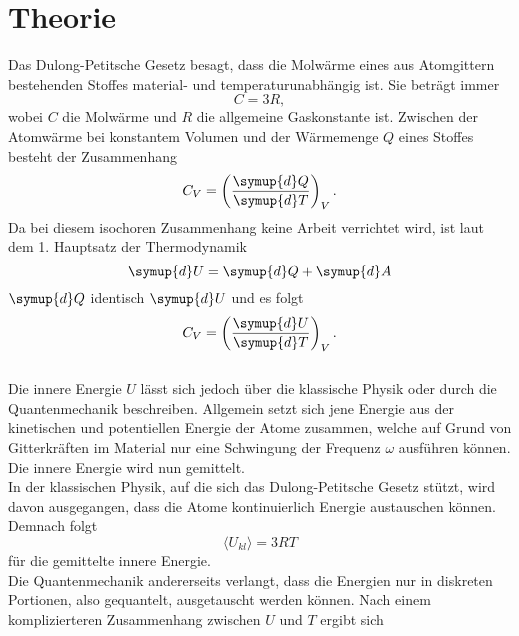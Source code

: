 \section{Theorie}
\label{sec:Theorie}
Das Dulong-Petitsche Gesetz besagt, dass die Molwärme eines aus Atomgittern bestehenden Stoffes material- und temperaturunabhängig ist.
Sie beträgt immer
\begin{equation}
  C = 3R,
  \label{eqn:1}
\end{equation}
wobei $C$ die Molwärme und $R$ die allgemeine Gaskonstante ist.
Zwischen der Atomwärme bei konstantem Volumen und der Wärmemenge $Q$ eines Stoffes besteht der Zusammenhang
\begin{equation}
  C_V = \left(\frac{\symup{d}Q}{\symup{d}T}\right)_V.
\end{equation}
Da bei diesem isochoren Zusammenhang keine Arbeit verrichtet wird, ist laut dem 1. Hauptsatz der Thermodynamik
\begin{equation}
  \symup{d}U = \symup{d}Q + \symup{d}A
  \label{eqn:2}
\end{equation}
$\symup{d}Q$ identisch $\symup{d}U$ und es folgt
\begin{equation}
  C_V = \left(\frac{\symup{d}U}{\symup{d}T}\right)_V.
\end{equation}\\
Die innere Energie $U$ lässt sich jedoch über die klassische Physik oder durch die Quantenmechanik beschreiben.
Allgemein setzt sich jene Energie aus der kinetischen und potentiellen Energie der Atome zusammen, welche auf Grund von Gitterkräften im Material nur eine Schwingung der Frequenz $\omega$ ausführen können.
Die innere Energie wird nun gemittelt.\\
In der klassischen Physik, auf die sich das Dulong-Petitsche Gesetz stützt, wird davon ausgegangen, dass die Atome kontinuierlich Energie austauschen können.
Demnach folgt
\begin{equation}
  \langle U_{kl} \rangle = 3RT
  \label{eqn:3}
\end{equation}
für die gemittelte innere Energie.\\
Die Quantenmechanik andererseits verlangt, dass die Energien nur in diskreten Portionen, also gequantelt, ausgetauscht werden können.
Nach einem komplizierteren Zusammenhang zwischen $U$ und $T$ ergibt sich
